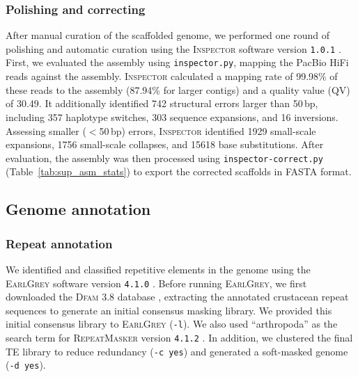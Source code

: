 \subsubsection*{Polishing and correcting}

After manual curation of the scaffolded genome, we performed one round of polishing and
automatic curation using the \textsc{Inspector} software version \texttt{1.0.1}
\citep{chen_accurate_2021}. First, we evaluated the assembly using \texttt{inspector.py},
mapping the PacBio HiFi reads against the assembly.
\textsc{Inspector} calculated a mapping rate of 99.98\% of these reads to the assembly
(87.94\% for larger contigs) and a quality value (QV) of 30.49.
It additionally identified 742 structural errors larger than 50\,bp, including
357 haplotype switches, 303 sequence expansions, and 16 inversions.
Assessing smaller ($<$50\,bp) errors, \textsc{Inspector} identified \num{1929} small-scale
expansions, \num{1756} small-scale collapses, and \num{15618} base substitutions.
After evaluation, the assembly was then processed using \texttt{inspector-correct.py}
(Table~\ref{tab:sup_asm_stats}) to export the corrected scaffolds in FASTA format.

\subsection*{Genome annotation}\label{sec:methods_annotation}

\subsubsection*{Repeat annotation}

We identified and classified repetitive elements in the \bgla{} genome
using the \textsc{EarlGrey} software version \texttt{4.1.0} \citep{baril_earl_2024}.
Before running \textsc{EarlGrey}, we first downloaded the \textsc{Dfam 3.8} database
\citep{storer_dfam_2021}, extracting the annotated crustacean repeat sequences to generate
an initial consensus masking library. We provided this initial consensus library to
\textsc{EarlGrey} (\texttt{-l}). We also used ``arthropoda'' as the search term for
\textsc{RepeatMasker} version \texttt{4.1.2} \citep{smit_repeatmasker_2013}. In addition,
we clustered the final TE library to reduce redundancy (\texttt{-c yes}) and generated a
soft-masked genome (\texttt{-d yes}).
\vspace{0.1cm}

